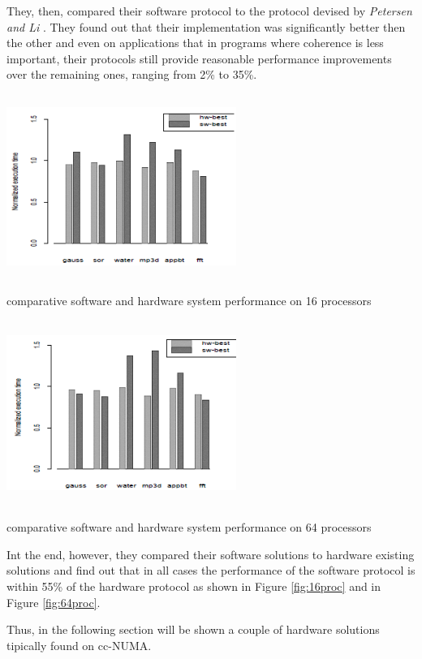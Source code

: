 \documentclass[a4paper,10pt]{article}
\makeatletter
\newenvironment{figurehere}{\def\@captype{figure}\vspace{2ex}}{\vspace{2ex}}
\makeatother
\begin{document}
\begin{multicols}{2}
They, then, compared their software protocol to the protocol devised by \emph{Petersen and Li} \cite{Li95multiprocessorcache}. They found out that their implementation was significantly better then the other and even on applications that in programs where coherence is less important, their protocols still provide reasonable performance improvements over the remaining ones, ranging from 2\% to 35\%.

\begin{figurehere}
 \centering
 \includegraphics[width=7.5cm, height=6cm]{./eps/result16proc.png}
 \caption{comparative software and hardware system performance on 16 processors}
 \label{fig:16proc}
\end{figurehere}


\begin{figurehere}
 \centering
 \includegraphics[width=7.5cm, height=6cm]{./eps/result64proc.png}
 \caption{comparative software and hardware system performance on 64 processors}
 \label{fig:64proc}
\end{figurehere}

Int the end, however, they compared their software solutions to hardware existing solutions and find out that in all cases the performance of the software protocol is within 55\% of the hardware protocol as shown in Figure \ref{fig:16proc} and in Figure \ref{fig:64proc}.\par
\parindent 10mm Thus, in the following section will be shown a couple of hardware solutions tipically found on cc-NUMA.


\end{multicols}
\end{document}
